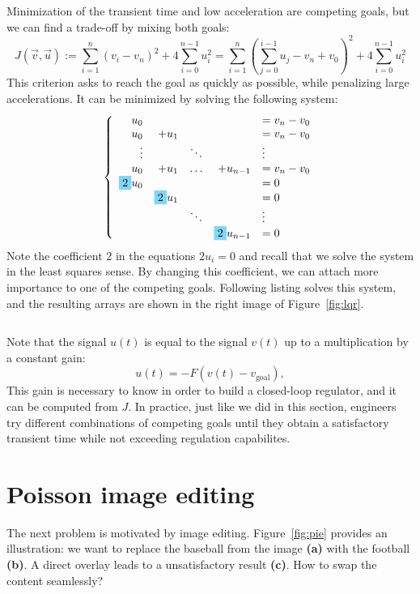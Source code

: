 \documentclass[notitlepage,oneside]{book}
\newcommand{\highlight}[1]{\colorbox{cyan!50}{$\displaystyle#1$}}
\begin{document}
Minimization of the transient time and low acceleration are competing goals, but we can find a trade-off by mixing both goals:
$$
J(\vec{v},\vec{u}) := \sum\limits_{i=1}^n (v_i-v_n)^2 + 4\sum\limits_{i=0}^{n-1} u_i^2 = \sum\limits_{i=1}^n \left(\sum\limits_{j=0}^{i-1}u_j-v_n+v_0\right)^2 + 4\sum\limits_{i=0}^{n-1} u_i^2
$$
This criterion asks to reach the goal as quickly as possible, while penalizing large accelerations. It can be minimized by solving the following system:
$$
\left \{ \begin{array}{rrrrl}
{u_0} &       &       &           & = {v_n} - {v_0} \\
{u_0} & + {u_1} &       &           & = {v_n} - {v_0} \\
\vdots    &       &   \ddots    &     &     \vdots        \\
{u_0} & + {u_1} & \dots & + {u_{n-1}} & = {v_n} - {v_0} \\
\highlight{2}{u_0} &        &       &           & = 0 \\
     &  \highlight{2}{u_1}  &       &           & = 0 \\
     &        &  \ddots     &     &  \vdots   \\
     &        &       &  \highlight{2}{u_{n-1}} & = 0 \\
\end{array} \right.
$$
Note the coefficient 2 in the equations $2 u_i = 0$ and recall that we solve the system in the least squares sense.
By changing this coefficient, we can attach more importance to one of the competing goals.
Following listing solves this system, and the resulting arrays are shown in the right image of Figure~\ref{fig:lqr}.

\inputminted[frame=single,linenos=true]{python}{listings/example_6.1_c.py}

Note that the signal $u(t)$ is equal to the signal $v(t)$ up to a multiplication by a constant gain:
$$
u(t) = -F (v(t) - v_{\text{goal}}),
$$
This gain is necessary to know in order to build a closed-loop regulator, and it can be computed from $J$.
In practice, just like we did in this section,
engineers try different combinations of competing goals until they obtain a satisfactory transient time while not exceeding regulation capabilites.



\section{Poisson image editing}
\label{sec:poisson}
The next problem is motivated by image editing.
Figure~\ref{fig:pie} provides an illustration:
we want to replace the baseball from the image \textbf{(a)} with the football \textbf{(b)}. A direct overlay leads to a unsatisfactory result \textbf{(c)}.
How to swap the content seamlessly?
\end{document}
